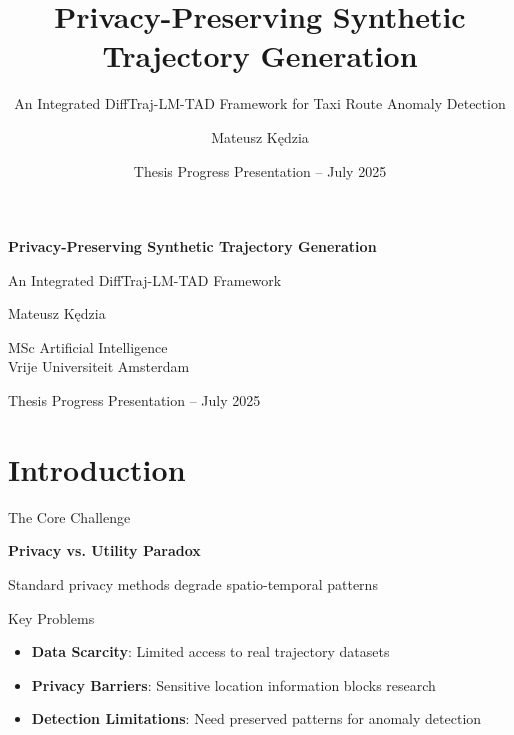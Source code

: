 \documentclass[aspectratio=169,xcolor={dvipsnames}]{beamer}
\title{Privacy-Preserving Synthetic Trajectory Generation}
\subtitle{An Integrated DiffTraj-LM-TAD Framework for Taxi Route Anomaly Detection}
\author{Mateusz Kędzia}
\institute{MSc Artificial Intelligence \\ Vrije Universiteit Amsterdam}
\date{Thesis Progress Presentation -- July 2025}
\newcommand{\highlight}[1]{\textcolor{RustyNail}{\textbf{#1}}}
\begin{document}
\begin{frame}[plain]
  \vspace{1.5cm}
  \centering
  {\color{VUBlue}\Huge\textbf{Privacy-Preserving Synthetic Trajectory Generation}}
  
  \vspace{0.5em}
  {\color{RichGold}\Large An Integrated DiffTraj-LM-TAD Framework}
  
  \vspace{1.5em}
  {\large Mateusz Kędzia}
  
  \vspace{0.5em}
  {\normalsize MSc Artificial Intelligence \\ Vrije Universiteit Amsterdam}
  
  \vspace{1em}
  {\small Thesis Progress Presentation -- July 2025}
\end{frame}

\section{Introduction}

\begin{frame}{The Core Challenge}
  \begin{block}{}
    \centering
    \Large \textbf{Privacy vs. Utility Paradox}
    
    \vspace{1em}
    
    \vspace{1em}
    \textcolor{Charcoal}{\small Standard privacy methods degrade spatio-temporal patterns}
  \end{block}
\end{frame}

\begin{frame}{Key Problems}
  \begin{block}{}
    \begin{itemize}
      \item \highlight{Data Scarcity}: Limited access to real trajectory datasets
      \item \highlight{Privacy Barriers}: Sensitive location information blocks research
      \item \highlight{Detection Limitations}: Need preserved patterns for anomaly detection
    \end{itemize}
  \end{block}
\end{frame}
\end{document}
